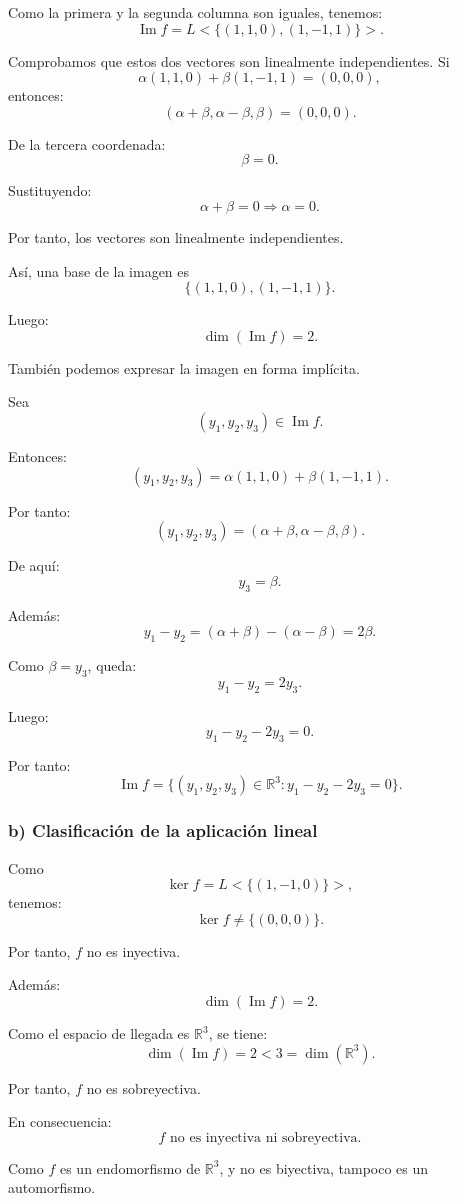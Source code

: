 \documentclass[12pt]{article}
\begin{document}
Como la primera y la segunda columna son iguales, tenemos:
\[
\operatorname{Im} f
=
L<\{(1,1,0),(1,-1,1)\}>.
\]

Comprobamos que estos dos vectores son linealmente independientes. Si
\[
\alpha(1,1,0)+\beta(1,-1,1)=(0,0,0),
\]
entonces:
\[
(\alpha+\beta,\alpha-\beta,\beta)=(0,0,0).
\]

De la tercera coordenada:
\[
\beta=0.
\]

Sustituyendo:
\[
\alpha+\beta=0
\Rightarrow
\alpha=0.
\]

Por tanto, los vectores son linealmente independientes.

Así, una base de la imagen es
\[
\boxed{\{(1,1,0),(1,-1,1)\}.}
\]

Luego:
\[
\boxed{\dim(\operatorname{Im} f)=2.}
\]

También podemos expresar la imagen en forma implícita.

Sea
\[
(y_1,y_2,y_3)\in \operatorname{Im} f.
\]

Entonces:
\[
(y_1,y_2,y_3)=\alpha(1,1,0)+\beta(1,-1,1).
\]

Por tanto:
\[
(y_1,y_2,y_3)=(\alpha+\beta,\alpha-\beta,\beta).
\]

De aquí:
\[
y_3=\beta.
\]

Además:
\[
y_1-y_2=(\alpha+\beta)-(\alpha-\beta)=2\beta.
\]

Como \(\beta=y_3\), queda:
\[
y_1-y_2=2y_3.
\]

Luego:
\[
y_1-y_2-2y_3=0.
\]

Por tanto:
\[
\boxed{
\operatorname{Im} f=
\{(y_1,y_2,y_3)\in\mathbb{R}^3:y_1-y_2-2y_3=0\}.
}
\]

\subsubsection*{b) Clasificación de la aplicación lineal}

Como
\[
\ker f=L<\{(1,-1,0)\}>,
\]
tenemos:
\[
\ker f\neq \{(0,0,0)\}.
\]

Por tanto, \(f\) no es inyectiva.

Además:
\[
\dim(\operatorname{Im} f)=2.
\]

Como el espacio de llegada es \(\mathbb{R}^3\), se tiene:
\[
\dim(\operatorname{Im} f)=2<3=\dim(\mathbb{R}^3).
\]

Por tanto, \(f\) no es sobreyectiva.

En consecuencia:
\[
\boxed{
f \text{ no es inyectiva ni sobreyectiva.}
}
\]

Como \(f\) es un endomorfismo de \(\mathbb{R}^3\), y no es biyectiva, tampoco es un automorfismo.
\end{document}
